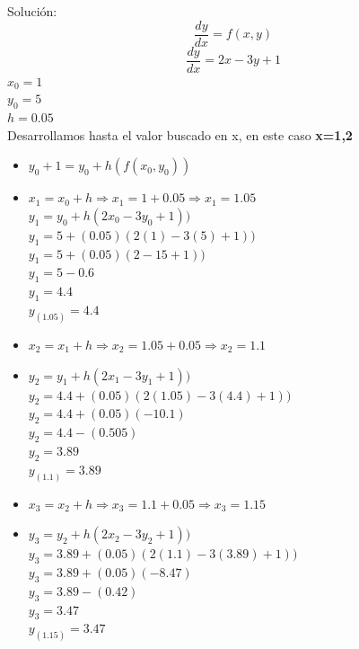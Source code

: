 \documentclass[12 pt,letterpaper]{article}
\begin{document}
    Solución:
    \begin{equation}
    \frac{dy}{dx}=f(x,y)
    \end{equation}
\begin{equation}
    \frac{dy}{dx}=2x-3y+1
    \end{equation}
$x_{0}=1$\\
$y_{0}=5$\\
$h=0.05$\\
\vspace{4mm} %
Desarrollamos hasta el valor buscado en x, en este caso \textbf {x=1,2}\\
\vspace{4mm} %
\begin{itemize}
\item\textbf{$y_{0}+1=y_{0}+h(f(x_{0},y_{0}))$}\\
\item\textbf{$x_{1}=x_{0}+h  \Rightarrow x_{1}=1+0.05\Rightarrow x_{1}=1.05 $} \\
{$y_{1}=y_{0}+h(2x_{0}-3y_{0}+1))$}\\
{$y_{1}=5+(0.05)(2(1)-3(5)+1))$}\\
{$y_{1}=5+(0.05)(2-15+1))$}\\
{$y_{1}=5-0.6$}\\
{$y_{1}=4.4$}\\
\textbf{$y_{(1.05)}=4.4$}\\
\end{itemize}
\vspace{0.8mm} %
\begin{itemize}
\item\textbf{$x_{2}=x_{1}+h  \Rightarrow x_{2}=1.05+0.05\Rightarrow x_{2}=1.1 $} \\
\item\textbf{$y_{2}=y_{1}+h(2x_{1}-3y_{1}+1))$}\\
{$y_{2}=4.4+(0.05)(2(1.05)-3(4.4)+1))$}\\
{$y_{2}=4.4+(0.05)(-10.1)$}\\
{$y_{2}=4.4-(0.505)$}\\
{$y_{2}=3.89$}\\
\textbf{$y_{(1.1)}=3.89$}\\
\end{itemize}
\vspace{0.5mm} %
\begin{itemize}
\item\textbf{$x_{3}=x_{2}+h  \Rightarrow x_{3}=1.1+0.05\Rightarrow x_{3}=1.15 $} \\
\item\textbf{$y_{3}=y_{2}+h(2x_{2}-3y_{2}+1))$}\\
{$y_{3}=3.89+(0.05)(2(1.1)-3(3.89)+1))$}\\
{$y_{3}=3.89+(0.05)(-8.47)$}\\
{$y_{3}=3.89-(0.42)$}\\
{$y_{3}=3.47$}\\
\textbf{$y_{(1.15)}=3.47$}\\
\end{itemize}
\end{document}
